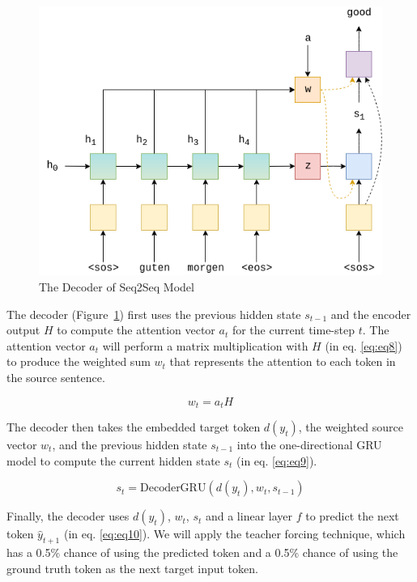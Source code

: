 \begin{figure}[h]
	\centering
	\includegraphics[scale=0.7]{../images/seq2seq_decoder_attention.png}
    \caption{The Decoder of Seq2Seq Model}
	\label{fig:seq2seq_decoder}
\end{figure}

The decoder (Figure~\ref{fig:seq2seq_decoder}) first uses the previous hidden state $s_{t-1}$ and the encoder output $H$ to compute the attention vector $a_t$ for the current time-step $t$. The attention vector $a_t$ will perform a matrix multiplication with $H$ (in eq. \ref{eq:eq8}) to produce the weighted sum $w_t$ that represents the attention to each token in the source sentence.

\begin{equation}
    w_t = a_tH \label{eq:eq8}
\end{equation}

The decoder then takes the embedded target token $d(y_t)$, the weighted source vector $w_t$, and the previous hidden state $s_{t-1}$ into the one-directional GRU model to compute the current hidden state $s_t$ (in eq. \ref{eq:eq9}).

\begin{equation}
    s_t = \text{DecoderGRU}(d(y_t), w_t, s_{t-1}) \label{eq:eq9}
\end{equation}

Finally, the decoder uses $d(y_t)$, $w_t$, $s_t$ and a linear layer $f$ to predict the next token $\hat{y}_{t+1}$ (in eq. \ref{eq:eq10}). We will apply the teacher forcing technique, which has a 0.5\% chance of using the predicted token and a 0.5\% chance of using the ground truth token as the next target input token.

